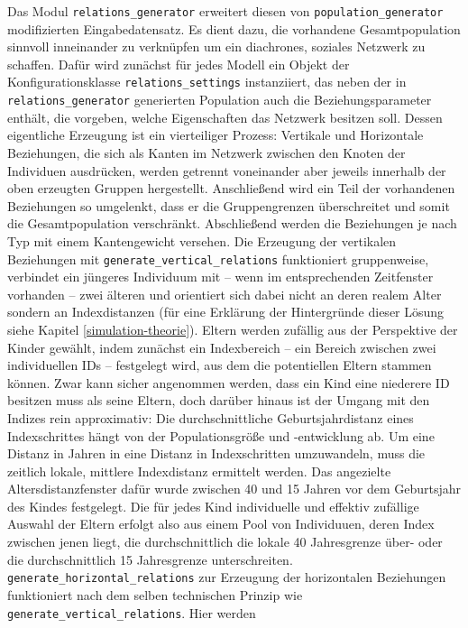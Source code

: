 \documentclass[openany,twoside,twocolumn]{book}
\begin{document}
Das Modul \texttt{relations\_generator} erweitert diesen von
\texttt{population\_generator} modifizierten Eingabedatensatz. Es dient
dazu, die vorhandene Gesamtpopulation sinnvoll inneinander zu verknüpfen
um ein diachrones, soziales Netzwerk zu schaffen. Dafür wird zunächst
für jedes Modell ein Objekt der Konfigurationsklasse
\texttt{relations\_settings} instanziiert, das neben der in
\texttt{relations\_generator} generierten Population auch die
Beziehungsparameter enthält, die vorgeben, welche Eigenschaften das
Netzwerk besitzen soll. Dessen eigentliche Erzeugung ist ein
vierteiliger Prozess: Vertikale und Horizontale Beziehungen, die sich
als Kanten im Netzwerk zwischen den Knoten der Individuen ausdrücken,
werden getrennt voneinander aber jeweils innerhalb der oben erzeugten
Gruppen hergestellt. Anschließend wird ein Teil der vorhandenen
Beziehungen so umgelenkt, dass er die Gruppengrenzen überschreitet und
somit die Gesamtpopulation verschränkt. Abschließend werden die
Beziehungen je nach Typ mit einem Kantengewicht versehen. Die Erzeugung
der vertikalen Beziehungen mit \texttt{generate\_vertical\_relations}
funktioniert gruppenweise, verbindet ein jüngeres Individuum mit -- wenn
im entsprechenden Zeitfenster vorhanden -- zwei älteren und orientiert
sich dabei nicht an deren realem Alter sondern an Indexdistanzen (für
eine Erklärung der Hintergründe dieser Lösung siehe Kapitel
\ref{simulation-theorie}). Eltern werden zufällig aus der Perspektive
der Kinder gewählt, indem zunächst ein Indexbereich -- ein Bereich
zwischen zwei individuellen IDs -- festgelegt wird, aus dem die
potentiellen Eltern stammen können. Zwar kann sicher angenommen werden,
dass ein Kind eine niederere ID besitzen muss als seine Eltern, doch
darüber hinaus ist der Umgang mit den Indizes rein approximativ: Die
durchschnittliche Geburtsjahrdistanz eines Indexschrittes hängt von der
Populationsgröße und -entwicklung ab. Um eine Distanz in Jahren in eine
Distanz in Indexschritten umzuwandeln, muss die zeitlich lokale,
mittlere Indexdistanz ermittelt werden. Das angezielte
Altersdistanzfenster dafür wurde zwischen 40 und 15 Jahren vor dem
Geburtsjahr des Kindes festgelegt. Die für jedes Kind individuelle und
effektiv zufällige Auswahl der Eltern erfolgt also aus einem Pool von
Individuuen, deren Index zwischen jenen liegt, die durchschnittlich die
lokale 40 Jahresgrenze über- oder die durchschnittlich 15 Jahresgrenze
unterschreiten. \texttt{generate\_horizontal\_relations} zur Erzeugung
der horizontalen Beziehungen funktioniert nach dem selben technischen
Prinzip wie \texttt{generate\_vertical\_relations}. Hier werden
\end{document}
